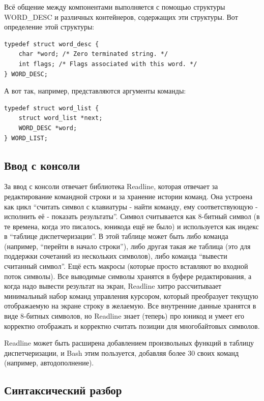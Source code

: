 \documentclass[a5paper]{article}
\begin{document}
Всё общение между компонентами выполняется с помощью структуры WORD\_DESC и различных контейнеров, содержащих эти структуры. Вот определение этой структуры:

\begin{verbatim}
typedef struct word_desc {
    char *word; /* Zero terminated string. */
    int flags; /* Flags associated with this word. */
} WORD_DESC;
\end{verbatim}

А вот так, например, представляются аргументы команды:

\begin{verbatim}
typedef struct word_list {
    struct word_list *next;
    WORD_DESC *word;
} WORD_LIST;
\end{verbatim}

\subsection{Ввод с консоли}

За ввод с консоли отвечает библиотека Readline, которая отвечает за редактирование командной строки и за хранение истории команд. Она устроена как цикл ``считать символ с клавиатуры - найти команду, ему соответствующую - исполнить её - показать результаты''. Символ считывается как 8-битный символ (в те времена, когда это писалось, юникода ещё не было) и используется как индекс в ``таблице диспетчеризации''. В этой таблице может быть либо команда (например, ``перейти в начало строки''), либо другая такая же таблица (это для поддержки сочетаний из нескольких символов), либо команда ``вывести считанный символ''. Ещё есть макросы (которые просто вставляют во входной поток символы). Все выводимые символы хранятся в буфере редактирования, а когда надо вывести результат на экран, Readline хитро рассчитываает минимальный набор команд управления курсором, который преобразует текущую отображаемую на экране строку в желаемую. Все внутренние данные хранятся в виде 8-битных символов, но Readline знает (теперь) про юникод и умеет его корректно отображать и корректно считать позиции для многобайтовых символов.

Readline может быть расширена добавлением произвольных функций в таблицу диспетчеризации, и Bash этим пользуется, добавляя более 30 своих команд (например, автодополнение).

\subsection{Синтаксический разбор}
\end{document}
